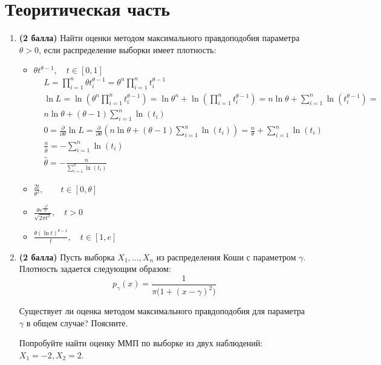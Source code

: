 \documentclass{assignment}
\begin{document}

\section*{Теоритическая часть}
\begin{enumerate}
    \item \textbf{(2 балла)} Найти оценки методом максимального правдоподобия параметра $\theta > 0$, если распределение выборки имеет плотность:
    \begin{itemize}
        \item $\theta t^{\theta - 1}, \quad t \in [0, 1]$
        \start
        \begin{align*}
            &L = \prod_{i=1}^{n} \theta t_i^{\theta - 1} = \theta^n \prod_{i=1}^{n} t_i^{\theta - 1} \\
            &\ln L = \ln (\theta^n \prod_{i=1}^{n} t_i^{\theta - 1}) = \ln \theta^n + \ln (\prod_{i=1}^{n} t_i^{\theta - 1}) = n \ln \theta + \sum_{i=1}^{n} \ln (t_i^{\theta - 1}) = \\
            &n \ln \theta + (\theta - 1)\sum_{i=1}^{n} \ln (t_i) \\
            &0 = \frac{\partial}{\partial \theta}\ln L = \frac{\partial}{\partial \theta}(n \ln \theta + (\theta - 1)\sum_{i=1}^{n} \ln (t_i)) = \frac{n}{\theta} + \sum_{i=1}^{n}\ln (t_i) \\
            &\frac{n}{\hat{\theta}} = -\sum_{i=1}^{n}\ln (t_i) \\
            & \hat{\theta} = - \frac{n}{\sum_{i=1}^{n}\ln (t_i)}
        \end{align*}
        \finish
        \item $\displaystyle \frac{2t}{\theta^2},\quad \quad  t \in [0, \theta]$
        \item $\displaystyle \frac{\theta e^{\frac{-\theta^2}{2t}}}{\sqrt{2 \pi t^3}}, \quad t > 0$
        \item $\displaystyle \frac{\theta (\ln{t})^{\theta - 1}}{t}, \quad t \in [1, e]$
    \end{itemize}

    \item \textbf{(2 балла)} Пусть выборка $X_1, \ldots, X_n$ из  распределения Коши с параметром $\gamma$. 
    Плотность задается следующим образом:
    $$
    p_{\gamma}(x) = \frac{1}{\pi \big(1 + (x - \gamma)^2\big)}
    $$

    Существует ли оценка методом максимального правдоподобия для параметра $\gamma$ в общем случае? Поясните.

    Попробуйте найти оценку ММП по выборке из двух наблюдений: $X_1 = -2, X_2 = 2$.
\end{enumerate}
    
\end{document}
